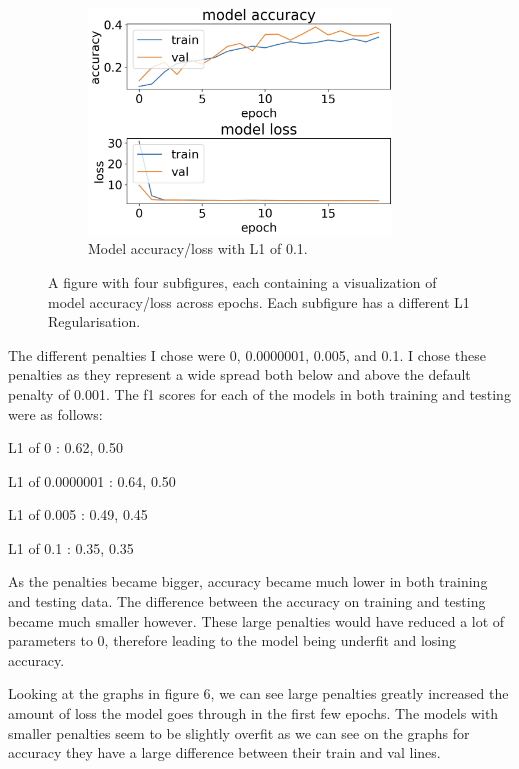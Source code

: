 \documentclass{article}
\begin{document}
\begin{figure} [H]
\begin{subfigure}{.5\linewidth}
\end{subfigure}%
\begin{subfigure}{.5\linewidth}
  \centering
  \includegraphics[width=\linewidth, height=6cm]{l1.png}
  \caption{Model accuracy/loss with L1 of 0.1.}
  \label{fig:sub3}
\end{subfigure}%
\caption{A figure with four subfigures, each containing a visualization of model accuracy/loss across epochs. Each subfigure has a different L1 Regularisation. }
\label{fig:test}
\end{figure}

The different penalties I chose were 0, 0.0000001, 0.005, and 0.1. I chose these penalties as they represent a wide spread both below and above the default penalty of 0.001. The f1 scores for each of the models in both training and testing were as follows:
\begin{center}
L1 of 0 : 0.62, 0.50

L1 of 0.0000001 : 0.64, 0.50

L1 of 0.005 : 0.49, 0.45

L1 of 0.1 : 0.35, 0.35
\end{center}
As the penalties became bigger, accuracy became much lower in both training and testing data. The difference between the accuracy on training and testing became much smaller however. These large penalties would have reduced a lot of parameters to 0, therefore leading to the model being underfit and losing accuracy.

Looking at the graphs in figure 6, we can see large penalties greatly increased the amount of loss the model goes through in the first few epochs. The models with smaller penalties seem to be slightly overfit as we can see on the graphs for accuracy they have a large difference between their train and val lines.
\end{document}
